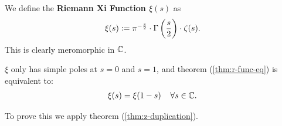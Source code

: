 \begin{definition}
We define the \textbf{Riemann Xi Function $\xi(s)$} as
\begin{align*}
    \xi(s) \vcentcolon = \pi^{-\frac{s}{2}} \cdot \Gamma\left( \frac{s}{2} \right) \cdot \zeta(s).
\end{align*}
This is clearly meromorphic in $\mathbb{C}$.
\end{definition}

\begin{theorem}
$\xi$ only has simple poles at $s= 0$ and $s=1$, and theorem (\ref{thm:r-func-eq}) is equivalent to:
\begin{align*}
    \xi(s) = \xi(1-s) \;\;\;\; \forall s \in \mathbb{C}.
\end{align*}
\end{theorem}

To prove this we apply theorem (\ref{thm:z-duplication}).

